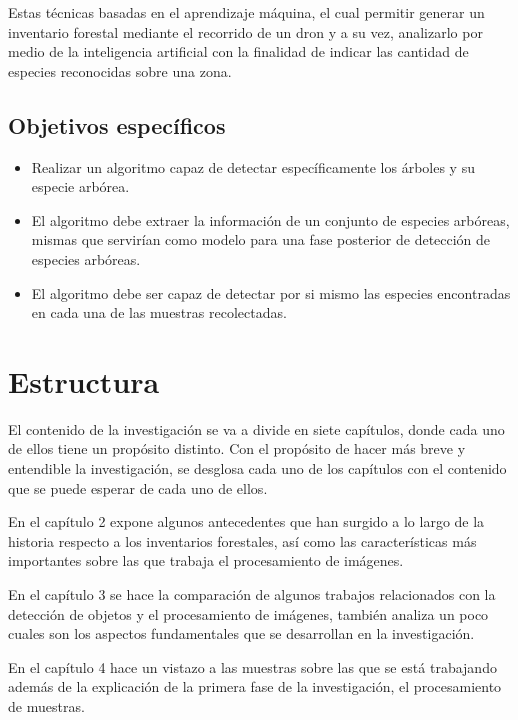 Estas técnicas  basadas en el aprendizaje máquina, el cual permitir
generar un inventario forestal mediante el recorrido de un dron y a su vez, analizarlo por medio de la inteligencia artificial con la finalidad de indicar las cantidad de especies reconocidas sobre una zona.

\subsection{Objetivos específicos}
\begin{itemize}
\item Realizar un algoritmo capaz de detectar específicamente los árboles y su especie arbórea.
\end{itemize}

\begin{itemize}
\item El algoritmo debe extraer la información de un conjunto de especies arbóreas, mismas que servirían como modelo para una fase posterior de detección de especies arbóreas.
\end{itemize}

\begin{itemize}
\item El algoritmo debe ser capaz de detectar por si mismo las especies encontradas en cada una de las muestras recolectadas.
\end{itemize}

\pagebreak

\section{Estructura}
El contenido de la investigación se va a divide en siete capítulos, donde cada uno de ellos tiene un propósito distinto. Con el propósito de hacer más breve y entendible la investigación, se desglosa cada uno de los capítulos con el contenido que se puede esperar de cada uno de ellos.

En el capítulo 2 expone algunos antecedentes que han surgido a lo largo
de la historia respecto a los inventarios forestales, así como las características más importantes sobre las que trabaja el procesamiento de imágenes.

En el capítulo 3 se hace la comparación de algunos trabajos relacionados con la detección de objetos y el procesamiento de imágenes, también analiza un poco cuales son los aspectos fundamentales que se desarrollan en la investigación.

En el capítulo 4 hace un vistazo a las muestras sobre las que se está trabajando además de la explicación de la primera fase de la investigación, el procesamiento de muestras.

